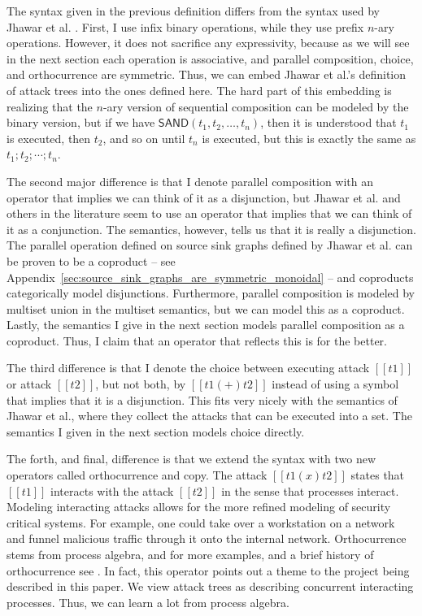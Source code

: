 \documentclass{llncs}
\begin{document}
The syntax given in the previous definition differs from the syntax
used by Jhawar et al. \cite{Jhawar:2015}.  First, I use infix binary
operations, while they use prefix $n$-ary operations. However, it does
not sacrifice any expressivity, because as we will see in the next
section each operation is associative, and parallel composition,
choice, and orthocurrence are symmetric.  Thus, we can embed Jhawar et
al.'s definition of attack trees into the ones defined here.  The hard
part of this embedding is realizing that the $n$-ary version of
sequential composition can be modeled by the binary version, but if we
have $\mathsf{SAND}(t_1,t_2,\ldots,t_n)$, then it is understood that
$t_1$ is executed, then $t_2$, and so on until $t_n$ is executed, but
this is exactly the same as $t_1;t_2;\cdots;t_n$.  

The second major difference is that I denote parallel composition with
an operator that implies we can think of it as a disjunction, but
Jhawar et al. and others in the literature seem to use an operator
that implies that we can think of it as a conjunction.  The semantics,
however, tells us that it is really a disjunction.  The parallel
operation defined on source sink graphs defined by Jhawar et
al. \cite{Jhawar:2015} can be proven to be a coproduct -- see
Appendix~\ref{sec:source_sink_graphs_are_symmetric_monoidal} -- and
coproducts categorically model disjunctions.  Furthermore, parallel
composition is modeled by multiset union in the multiset semantics,
but we can model this as a coproduct.  Lastly, the semantics I give in
the next section models parallel composition as a coproduct.  Thus, I
claim that an operator that reflects this is for the better.

The third difference is that I denote the choice between executing
attack $[[t1]]$ or attack $[[t2]]$, but not both, by $[[t1 (+) t2]]$
instead of using a symbol that implies that it is a disjunction.  This
fits very nicely with the semantics of Jhawar et al., where they
collect the attacks that can be executed into a set.  The semantics I
given in the next section models choice directly.

The forth, and final, difference is that we extend the syntax with two
new operators called orthocurrence and copy.  The attack $[[t1 (x)
    t2]]$ states that $[[t1]]$ interacts with the attack $[[t2]]$ in
the sense that processes interact.  Modeling interacting attacks
allows for the more refined modeling of security critical systems.
For example, one could take over a workstation on a network and funnel
malicious traffic through it onto the internal network.  Orthocurrence
stems from process algebra, and for more examples, and a brief history
of orthocurrence see \cite{Pratt:2001}.  In fact, this operator points
out a theme to the project being described in this paper.  We view
attack trees as describing concurrent interacting processes.  Thus, we
can learn a lot from process algebra.
\end{document}
